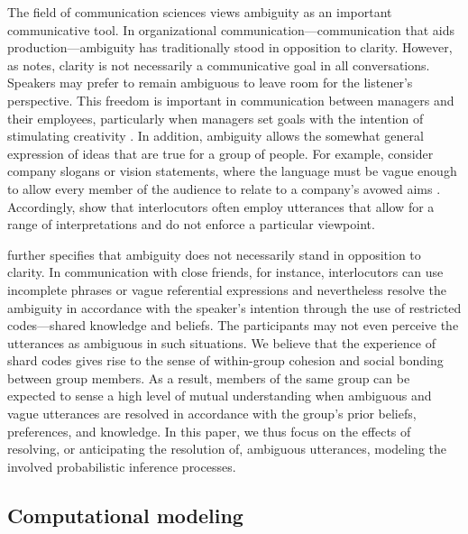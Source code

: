 \documentclass[10pt,a4paper]{article}
\newcommand{\gcs}[1]{\textcolor{blue}{[gcs: #1]}}
\begin{document}
The field of communication sciences views ambiguity as an important communicative tool. %
In organizational communication---communication that aids production---ambiguity has traditionally stood in opposition to clarity. However, as  notes, clarity is not necessarily a communicative goal in all conversations. Speakers may prefer to remain ambiguous to leave room for the listener's perspective. This freedom is important in communication between managers and their employees, particularly when managers set goals with the intention of stimulating creativity \cite{mohr1983implications}.
In addition, ambiguity allows the somewhat general expression of ideas that are true for a group of people. 
For example, consider company slogans or vision statements, where the language must be vague enough to allow every member of the audience to relate to a company's avowed aims \cite{carmon2013}. 
Accordingly,  show that interlocutors often employ utterances that allow for a range of interpretations and do not enforce a particular viewpoint.

 further specifies that ambiguity does not necessarily stand in opposition to clarity. In communication with close friends, for instance, interlocutors can use incomplete phrases or vague referential expressions and nevertheless resolve the ambiguity in accordance with the speaker's intention through the use of restricted codes---shared knowledge and beliefs. The participants may not even perceive the utterances as ambiguous in such situations. We believe that the experience of shard codes gives rise to the sense of within-group cohesion and social bonding between group members.
As a result, members of the same group can be expected to sense a high level of mutual understanding when ambiguous and vague utterances are resolved in accordance with the group's prior beliefs, preferences, and knowledge.
In this paper, we thus focus on the effects of resolving, or anticipating the resolution of, ambiguous utterances, modeling the involved probabilistic inference processes. 



\subsection{Computational modeling}
\end{document}

